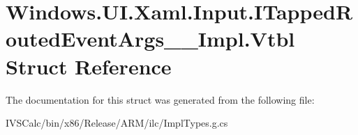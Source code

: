 \hypertarget{struct_windows_1_1_u_i_1_1_xaml_1_1_input_1_1_i_tapped_routed_event_args_____impl_1_1_vtbl}{}\section{Windows.\+U\+I.\+Xaml.\+Input.\+I\+Tapped\+Routed\+Event\+Args\+\_\+\+\_\+\+Impl.\+Vtbl Struct Reference}
\label{struct_windows_1_1_u_i_1_1_xaml_1_1_input_1_1_i_tapped_routed_event_args_____impl_1_1_vtbl}


The documentation for this struct was generated from the following file\+:\begin{DoxyCompactItemize}
\item 
I\+V\+S\+Calc/bin/x86/\+Release/\+A\+R\+M/ilc/Impl\+Types.\+g.\+cs\end{DoxyCompactItemize}

